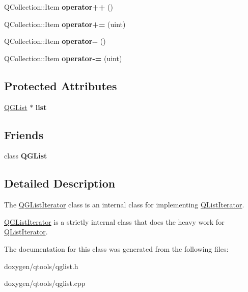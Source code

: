 \begin{DoxyCompactItemize}
\item 
\mbox{\label{class_q_g_list_iterator_a5b09cd40d71a15e6737ab03e7f5594c7}} 
Q\+Collection\+::\+Item {\bfseries operator++} ()
\item 
\mbox{\label{class_q_g_list_iterator_a291ca7794aaf9b6ac8621bcbdd7b866c}} 
Q\+Collection\+::\+Item {\bfseries operator+=} (uint)
\item 
\mbox{\label{class_q_g_list_iterator_a4a907a254a5e31214aad4f46d0333915}} 
Q\+Collection\+::\+Item {\bfseries operator-\/-\/} ()
\item 
\mbox{\label{class_q_g_list_iterator_aa751103a7fcd16685a78f7272720217f}} 
Q\+Collection\+::\+Item {\bfseries operator-\/=} (uint)
\end{DoxyCompactItemize}
\subsection*{Protected Attributes}
\begin{DoxyCompactItemize}
\item 
\mbox{\label{class_q_g_list_iterator_a6e606950ab50b273e8370d9e24756bf2}} 
\mbox{\hyperlink{class_q_g_list}{Q\+G\+List}} $\ast$ {\bfseries list}
\end{DoxyCompactItemize}
\subsection*{Friends}
\begin{DoxyCompactItemize}
\item 
\mbox{\label{class_q_g_list_iterator_a9bfde3c3259271cb86b87bd78b399dd5}} 
class {\bfseries Q\+G\+List}
\end{DoxyCompactItemize}


\subsection{Detailed Description}
The \mbox{\hyperlink{class_q_g_list_iterator}{Q\+G\+List\+Iterator}} class is an internal class for implementing \mbox{\hyperlink{class_q_list_iterator}{Q\+List\+Iterator}}. 

\mbox{\hyperlink{class_q_g_list_iterator}{Q\+G\+List\+Iterator}} is a strictly internal class that does the heavy work for \mbox{\hyperlink{class_q_list_iterator}{Q\+List\+Iterator}}. 

The documentation for this class was generated from the following files\+:\begin{DoxyCompactItemize}
\item 
doxygen/qtools/qglist.\+h\item 
doxygen/qtools/qglist.\+cpp\end{DoxyCompactItemize}
